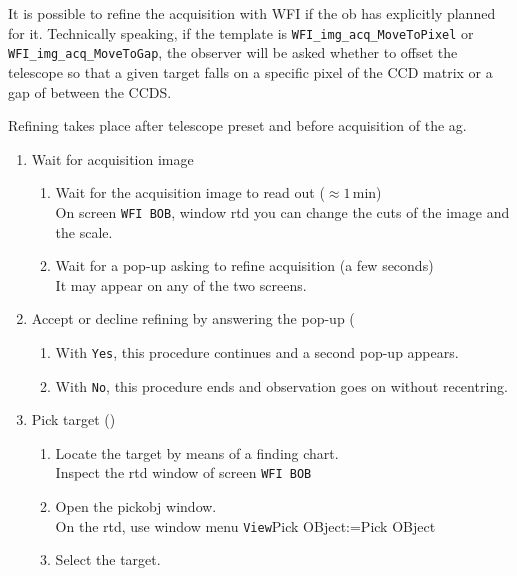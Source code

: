 \documentclass[11pt,fleqn,a4paper]{book}
\makeatletter
\def\menu#1#2{\texttt{#1}\ifx{}#2\else\@for\@x:=#2\do{$\rightarrow$\texttt{\@x}}\fi}
\def\wmenu#1#2{window menu \menu{#1}{#2}}
\makeatother
\begin{document}
It is possible to refine the \gls{acquisition} with WFI if the \gls{ob} has explicitly planned for it. Technically speaking, if the \gls{template} is \texttt{WFI\_img\_acq\_MoveToPixel} or \texttt{WFI\_img\_acq\_MoveToGap}, the observer will be asked whether to offset the telescope so that a given target falls on a specific pixel of the CCD matrix or a gap of between the CCDS.

Refining takes place after telescope \gls{preset} and before acquisition of the \gls{ag}.

\begin{enumerate}
    \item\label{list:refine:img} Wait for acquisition image 
    \begin{enumerate}
        \item Wait for the acquisition image to read out ($\approx 1$\,min)\\
              On screen \texttt{WFI BOB}, window \gls{rtd} you can change
              the cuts of the image and the scale.
        \item Wait for a pop-up asking to refine acquisition (a few seconds)\\
              It may appear on any of the two screens. 
    \end{enumerate}
    \item Accept or decline refining by answering the pop-up  (
    \begin{enumerate}
        \item With \texttt{Yes}, this procedure continues and a second
        pop-up appears.
        \item With \texttt{No}, this procedure ends and observation goes on without recentring.
    \end{enumerate}
    \item\label{list:refine:pick} Pick target ()
    \begin{enumerate}
        \item Locate the target by means of a finding chart.\\
              Inspect the \gls{rtd}  window of screen \texttt{WFI BOB}
        \item Open the \gls{pickobj} window.\\
              On the \gls{rtd}, use \wmenu{View}{Pick OBject}
        \item Select the target.
        \begin{enumerate}

\end{enumerate}
\end{enumerate}
\end{enumerate}
\end{document}
